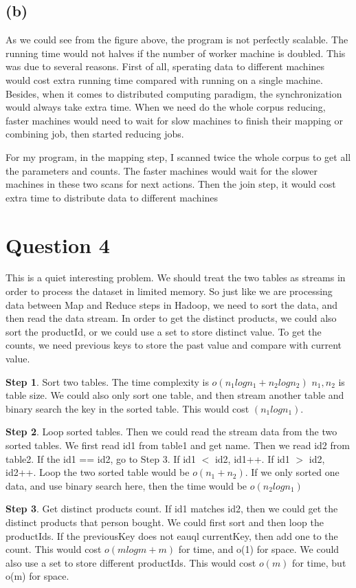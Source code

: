 \documentclass{article} %
\begin{document}
\subsection{(b)}
As we could see from the figure above, the program is not perfectly scalable.
The running time would not halves if the number of worker machine is doubled.
This was due to several reasons. First of all, sperating data to different
machines would cost extra running time compared with running on a single
machine. Besides, when it comes to distributed computing paradigm, the
synchronization would always take extra time. When we need do the whole corpus
reducing, faster machines would need to wait for slow machines to finish their
mapping or combining job, then started reducing jobs.

For my program, in the mapping step, I scanned twice the whole corpus to get all
the parameters and counts. The faster machines would wait for the slower
machines in these two scans for next actions. Then the join step, it would cost
extra time to distribute data to different machines


\section{Question 4}
This is a quiet interesting problem. We should treat the two tables as streams
in order to process the dataset in limited memory. So just like we are
processing data between Map and Reduce steps in Hadoop, we need to sort the
data, and then read the data stream. In order to get the distinct products, we
could also sort the productId, or we could use a set to store distinct value.
To get the counts, we need previous keys to store the past value and compare
with current value.

\textbf{Step 1}. Sort two tables. The time complexity is $o(n_1 logn_1+n_2logn_2)$ $n_1,
n_2$ is table size. We could also only sort one table, and then stream another
table and binary search the key in the sorted table. This would cost
$(n_1logn_1)$.

\textbf{Step 2}. Loop sorted tables. Then we could read the stream data from the two
sorted tables. We first read id1 from table1 and get name. Then we read id2
from table2. If the id1 == id2, go to Step 3. If id1 $<$ id2, id1++. If id1
$>$ id2, id2++. Loop the two sorted table would be $o(n_1+n_2)$. If we only
sorted one data, and use binary search here, then the time would be
$o(n_2logn_1)$

\textbf{Step 3}. Get distinct products count. If id1 matches id2, then we could get the
distinct products that person bought. We could first sort and then loop the
productIds. If the previousKey does not eauql currentKey, then add one to the
count. This would cost $o(mlogm + m)$ for time, and o(1) for space. We could
also use a set to store different productIds. This would cost $o(m)$ for time,
but o(m) for space.
\end{document}
